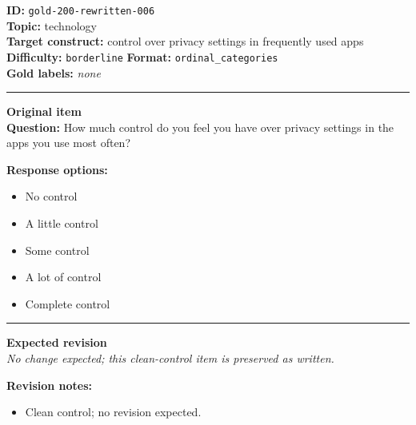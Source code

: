 \documentclass[10pt,a4paper]{article}
\newcommand{\sectionline}{\vspace{0.15em}\hrule\vspace{0.35em}}
\begin{document}
\begin{tcolorbox}[colframe=CleanGreen,colback=white,colbacktitle=CleanGreen!9,coltitle=black,title={Item 006\hfill Clean control}]
\textbf{ID:} \texttt{gold-200-rewritten-006}\\
\textbf{Topic:} technology\\
\textbf{Target construct:} control over privacy settings in frequently used apps\\
\textbf{Difficulty:} \texttt{borderline} \quad \textbf{Format:} \texttt{ordinal\_categories}\\
\textbf{Gold labels:} \textit{none}\\
\sectionline
\textbf{Original item}\\
\textbf{Question:} How much control do you feel you have over privacy settings in the apps you use most often?
\par\textbf{Response options:}
\begin{itemize}
\item No control
\item A little control
\item Some control
\item A lot of control
\item Complete control
\end{itemize}
\sectionline
\textbf{Expected revision}\\
\textit{No change expected; this clean-control item is preserved as written.}
\par\textbf{Revision notes:}
\begin{itemize}
\item Clean control; no revision expected.
\end{itemize}
\end{tcolorbox}
\end{document}
